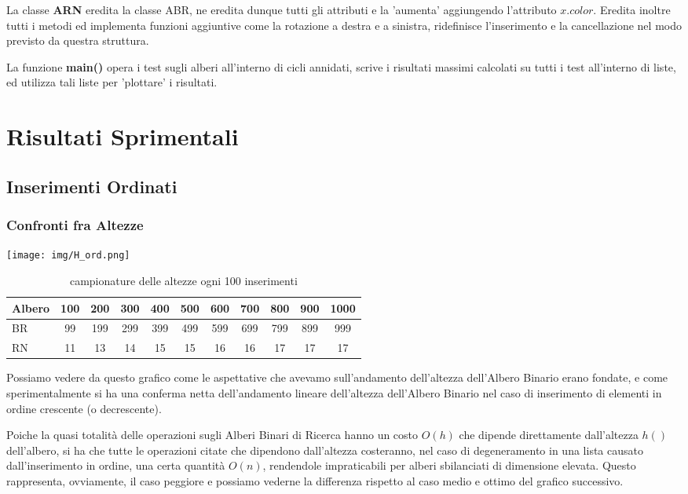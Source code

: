 \documentclass{article}
\begin{document}
La classe \textbf{ARN} eredita la classe ABR, ne eredita dunque tutti gli attributi e la 'aumenta' aggiungendo l'attributo $x.color$. Eredita inoltre tutti i metodi ed implementa funzioni aggiuntive come la rotazione a destra e a sinistra, ridefinisce l'inserimento e la cancellazione nel modo previsto da questra struttura.


La funzione \textbf{main()} opera i test sugli alberi all'interno di cicli annidati, scrive i risultati massimi calcolati su tutti i test all'interno di liste, ed utilizza tali liste per 'plottare' i risultati.

\newpage
\section{Risultati Sprimentali}

\subsection{Inserimenti Ordinati}

\subsubsection{Confronti fra Altezze}
\begin{center}
    \texttt{[image: img/H\_ord.png]}
\end{center}
\begin{table}[htbp]
\centering 
\caption{campionature delle altezze ogni 100 inserimenti\label{ordInsert}}
\begin{tabular}{l c c c c c c c c c c}
\hline\hline
\multicolumn{1}{c}{\textbf{Albero}}& \textbf{100}& \textbf{200} & \textbf{300}& \textbf{400}& \textbf{500} & \textbf{600}& \textbf{700}& \textbf{800}& \textbf{900}& \textbf{1000}\\ \hline
BR & 99 & 199 & 299 & 399 & 499 & 599 & 699 & 799 & 899 & 999\\
RN & 11 & 13 & 14 & 15 & 15 & 16 & 16 & 17 & 17 & 17\\
\hline
\end{tabular}
\end{table}
Possiamo vedere da questo grafico come le aspettative che avevamo sull'andamento dell'altezza dell'Albero Binario erano fondate, e come sperimentalmente si ha una conferma netta dell'andamento lineare dell'altezza dell'Albero Binario nel caso di inserimento di elementi in ordine crescente (o decrescente). 


Poiche la quasi totalità delle operazioni sugli Alberi Binari di Ricerca hanno un costo $O(h)$ che dipende direttamente dall'altezza $h()$ dell'albero, si ha che tutte le operazioni citate che dipendono dall'altezza costeranno, nel caso di degeneramento in una lista causato dall'inserimento in ordine, una certa quantità $O(n)$, rendendole impraticabili per alberi sbilanciati di dimensione elevata.
Questo rappresenta, ovviamente, il caso peggiore e possiamo vederne la differenza rispetto al caso medio e ottimo del grafico successivo.
\end{document}
